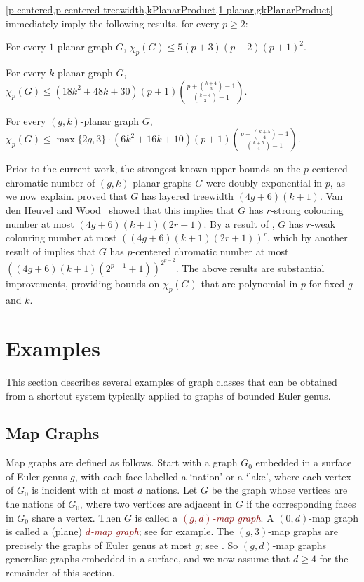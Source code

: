 \documentclass{patmorin}
\newcommand{\defin}[1]{\textcolor{Maroon}{\emph{#1}}}
\renewcommand{\ge}{\geqslant}
\renewcommand{\le}{\leqslant}
\renewcommand{\geq}{\geqslant}
\begin{document}
\cref{p-centered,p-centered-treewidth,kPlanarProduct,1-planar,gkPlanarProduct} immediately imply the following results, for every $p\ge 2$:

\begin{cor}\quad
\begin{compactitem}
\item For every $1$-planar graph $G$,\; $ \chi_p(G)\le 5 (p+3)(p+2)(p+1)^2$.
\item For every $k$-planar graph $G$,\; $\displaystyle \chi_p(G)\le (18k^2+48k+30)(p+1) \binom{p+ \binom{k+4}{3}-1}{ \binom{k+4}{3}-1}$.
\item For every $(g,k)$-planar graph $G$,\;
$\displaystyle \chi_p(G) \le \max\{2g,3\}\cdot(6k^2+16k+10) (p+1) \binom{p+\binom{k+5}{4}-1}{\binom{k+5}{4}-1}$.
 \end{compactitem}
\end{cor}

Prior to the current work, the strongest known upper bounds on the $p$-centered chromatic number of $(g,k)$-planar graphs $G$ were doubly-exponential in $p$, as we now explain. \citet{dujmovic.eppstein.ea:structure} proved that $G$ has layered treewidth $(4g+6)(k+1)$.
Van den Heuvel and Wood~\citep{vdHW17} showed that this implies that $G$  has $r$-strong colouring number at most $(4g + 6)(k + 1)(2r + 1)$. By a result of \citet{zhu:colouring}, $G$ has $r$-weak colouring number at most $( (4g + 6)(k + 1)(2r + 1) )^r$, which by another result of  \citet{zhu:colouring} implies that $G$ has  $p$-centered chromatic number at most $( (4g+6)(k+1)(2^{p-1} + 1) )^{2^{p-2}}$. The above results are substantial improvements, providing bounds on $\chi_p(G)$ that are polynomial in $p$ for fixed $g$ and $k$.


\section{Examples}
\label{Examples}

This section describes several examples of graph classes that can be obtained from a shortcut system typically applied to graphs of bounded Euler genus.


\subsection{Map Graphs}

Map graphs are defined as follows. Start with a graph $G_0$ embedded in a surface of Euler genus $g$, with each face labelled a `nation' or a `lake', where each vertex of $G_0$ is incident with at most $d$ nations. Let $G$ be the graph whose vertices are the nations of $G_0$, where two vertices are adjacent in $G$ if the corresponding faces in $G_0$ share a vertex. Then $G$ is called a \defin{$(g,d)$-map graph}.  A $(0,d)$-map graph is called a (plane) \defin{$d$-map graph}; see \citep{FLS-SODA12,CGP02} for example.
The $(g,3)$-map graphs are precisely the graphs of Euler genus at most $g$; see \citep{dujmovic.eppstein.ea:structure}. So $(g,d)$-map graphs generalise graphs embedded in a surface, and we now assume that $d\geq 4$ for the remainder of this section.
\end{document}
